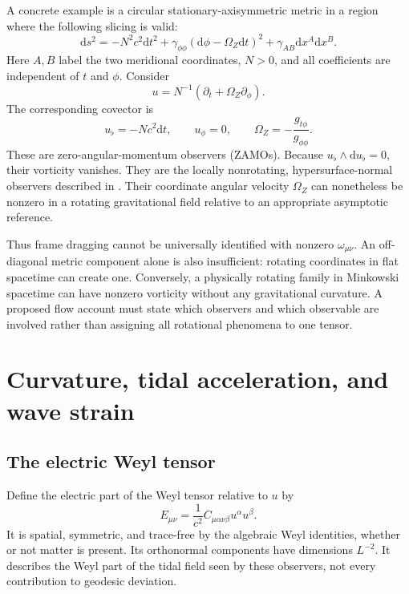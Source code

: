 \documentclass[11pt,oneside]{report}
\newcommand{\dd}{\mathrm d}
\theoremstyle{remark}
\numberwithin{definition}{chapter}
\numberwithin{proposition}{chapter}
\numberwithin{remark}{chapter}
\begin{document}
A concrete example is a circular stationary-axisymmetric metric in a region where the following slicing is valid:
\begin{equation}
\dd s^2=-N^2c^2\dd t^2+
\gamma_{\phi\phi}(\dd\phi-\Omega_Z\dd t)^2+
\gamma_{AB}\dd x^A\dd x^B.
\end{equation}
Here $A,B$ label the two meridional coordinates, $N>0$, and all coefficients are independent of $t$ and $\phi$. Consider
\begin{equation}
u=N^{-1}(\partial_t+\Omega_Z\partial_\phi).
\end{equation}
The corresponding covector is
\begin{equation}
u_\flat=-Nc^2\dd t,
\qquad u_\phi=0,
\qquad \Omega_Z=-\frac{g_{t\phi}}{g_{\phi\phi}}.
\end{equation}
These are zero-angular-momentum observers (ZAMOs). Because
$u_\flat\wedge\dd u_\flat=0$, their vorticity vanishes. They are the locally nonrotating, hypersurface-normal observers described in \textcite{Gourgoulhon2010}. Their coordinate angular velocity $\Omega_Z$ can nonetheless be nonzero in a rotating gravitational field relative to an appropriate asymptotic reference.

Thus frame dragging cannot be universally identified with nonzero $\omega_{\mu\nu}$. An off-diagonal metric component alone is also insufficient: rotating coordinates in flat spacetime can create one. Conversely, a physically rotating family in Minkowski spacetime can have nonzero vorticity without any gravitational curvature. A proposed flow account must state which observers and which observable are involved rather than assigning all rotational phenomena to one tensor.

\section{Curvature, tidal acceleration, and wave strain}
\subsection{The electric Weyl tensor}
Define the electric part of the Weyl tensor relative to $u$ by
\begin{equation}
E_{\mu\nu}=\frac{1}{c^2}C_{\mu\alpha\nu\beta}u^\alpha u^\beta.
\label{geometry:eq:weylelectric}
\end{equation}
It is spatial, symmetric, and trace-free by the algebraic Weyl identities, whether or not matter is present. Its orthonormal components have dimensions $L^{-2}$. It describes the Weyl part of the tidal field seen by these observers, not every contribution to geodesic deviation.
\end{document}

